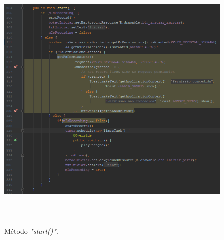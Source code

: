  \begin{figure}[H]
 	\centering
 	\caption[M\'etodo \textit{"start()"}]{M\'etodo \textit{"start()"}. \label{fig:metodostart}}
 	\includegraphics[height=13cm]{./Figuras/metodo_start.png}%
 \end{figure}
 
 





